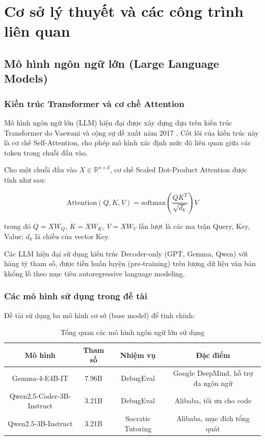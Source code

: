 \chapter{Cơ sở lý thuyết và các công trình liên quan}
\label{chap:related_work}

\section{Mô hình ngôn ngữ lớn (Large Language Models)}

\subsection{Kiến trúc Transformer và cơ chế Attention}

Mô hình ngôn ngữ lớn (LLM) hiện đại được xây dựng dựa trên kiến trúc Transformer do Vaswani và cộng sự đề xuất năm 2017 \cite{vaswani2017attention}. Cốt lõi của kiến trúc này là cơ chế Self-Attention, cho phép mô hình xác định mức độ liên quan giữa các token trong chuỗi đầu vào.

Cho một chuỗi đầu vào $X \in \mathbb{R}^{n \times d}$, cơ chế Scaled Dot-Product Attention được tính như sau:

\begin{equation}
    \text{Attention}(Q, K, V) = \text{softmax}\left(\frac{QK^T}{\sqrt{d_k}}\right) V
\end{equation}

trong đó $Q = XW_Q$, $K = XW_K$, $V = XW_V$ lần lượt là các ma trận Query, Key, Value; $d_k$ là chiều của vector Key.

Các LLM hiện đại sử dụng kiến trúc Decoder-only (GPT, Gemma, Qwen) với hàng tỷ tham số, được tiền huấn luyện (pre-training) trên lượng dữ liệu văn bản khổng lồ theo mục tiêu autoregressive language modeling.

\subsection{Các mô hình sử dụng trong đề tài}

Đề tài sử dụng ba mô hình cơ sở (base model) để tinh chỉnh:

\begin{table}[h]
\centering
\renewcommand{\arraystretch}{1.3}
\caption{Tổng quan các mô hình ngôn ngữ lớn sử dụng}
\label{tab:models}
\begin{tabular}{|c|c|c|c|}
\hline
\textbf{Mô hình} & \textbf{Tham số} & \textbf{Nhiệm vụ} & \textbf{Đặc điểm} \\
\hline
Gemma-4-E4B-IT & 7.96B & DebugEval & Google DeepMind, hỗ trợ đa ngôn ngữ \\
\hline
Qwen2.5-Coder-3B-Instruct & 3.21B & DebugEval & Alibaba, tối ưu cho code \\
\hline
Qwen2.5-3B-Instruct & 3.21B & Socratic Tutoring & Alibaba, mục đích tổng quát \\
\hline
\end{tabular}
\end{table}

